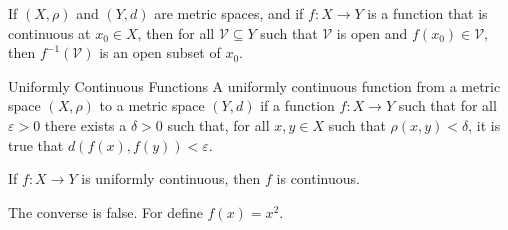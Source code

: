 \documentclass[crop=false,class=book,oneside]{standalone}
\begin{document}
            \begin{theorem}
                If $(X,\rho)$ and $(Y,d)$ are metric spaces, and if
                $f:X\rightarrow{Y}$ is a function that is
                continuous at $x_{0}\in{X}$, then for
                all $\mathcal{V}\subseteq{Y}$ such that
                $\mathcal{V}$ is open and $f(x_{0})\in\mathcal{V}$,
                then $f^{-1}(\mathcal{V})$ is an open subset
                of $x_{0}$.
            \end{theorem}
            \begin{ldefinition}{Uniformly Continuous Functions}
                A uniformly continuous function from a metric space
                $(X,\rho)$ to a metric space $(Y,d)$ if a function
                $f:X\rightarrow{Y}$ such that for all
                $\varepsilon>0$ there exists a $\delta>0$ such
                that, for all $x,y\in{X}$ such that
                $\rho(x,y)<\delta$, it is true that
                $d(f(x),f(y))<\varepsilon$.
            \end{ldefinition}
            \begin{theorem}
                If $f:X\rightarrow{Y}$ is uniformly continuous,
                then $f$ is continuous.
            \end{theorem}
            The converse is false. For define $f(x)=x^{2}$.
\end{document}

